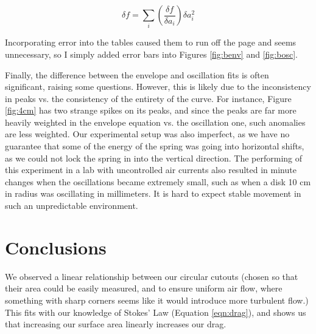 \documentclass[12pt,letterpaper]{article}
\begin{document}
\begin{equation}
    \delta f=\sum_i \left(\frac{\delta f}{\delta a_i}\right)\delta a_i^2
\end{equation}

Incorporating error into the tables caused them to run off the page and seems unnecessary, so I simply added error bars into Figures \ref{fig:benv} and \ref{fig:bosc}.

Finally, the difference between the envelope and oscillation fits is often significant, raising some questions. However, this is likely due to the inconsistency in peaks vs. the consistency of the entirety of the curve. For instance, Figure \ref{fig:4cm} has two strange spikes on its peaks, and since the peaks are far more heavily weighted in the envelope equation vs. the oscillation one, such anomalies are less weighted. Our experimental setup was also imperfect, as we have no guarantee that some of the energy of the spring was going into horizontal shifts, as we could not lock the spring in into the vertical direction. The performing of this experiment in a lab with uncontrolled air currents also resulted in minute changes when the oscillations became extremely small, such as when a disk 10 cm in radius was oscillating in millimeters. It is hard to expect stable movement in such an unpredictable environment.

\section{Conclusions}

We observed a linear relationship between our circular cutouts (chosen so that their area could be easily measured, and to ensure uniform air flow, where something with sharp corners seems like it would introduce more turbulent flow.) This fits with our knowledge of Stokes' Law (Equation \ref{eqn:drag}), and shows us that increasing our surface area linearly increases our drag.

% 
% 
\end{document}
